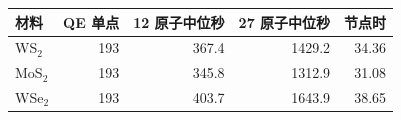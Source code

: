 \begin{tabular}{lrrrr}
\toprule
材料 & QE 单点 & 12 原子中位秒 & 27 原子中位秒 & 节点时 \\
\midrule
WS$_2$ & 193 & 367.4 & 1429.2 & 34.36 \\
MoS$_2$ & 193 & 345.8 & 1312.9 & 31.08 \\
WSe$_2$ & 193 & 403.7 & 1643.9 & 38.65 \\
\bottomrule
\end{tabular}

